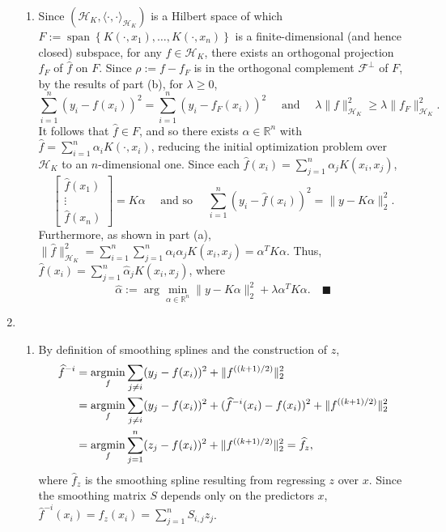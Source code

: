 \documentclass[11pt]{article}
\renewcommand{\qed}{\quad \ensuremath{\blacksquare}}
\newcommand{\vspan}{\operatorname{span}}
\newcommand{\F}{\mathcal{F}}
\newcommand{\R}{\mathbb{R}} %
\renewcommand{\H}{\mathscr{H}} %
\renewcommand{\hat}{\widehat}
\newcommand{\argmin}{\operatornamewithlimits{argmin}}
\begin{document}
\begin{enumerate}
\begin{enumerate}
\item Since $(\H_K, \langle \cdot, \cdot \rangle_{\H_K})$ is a Hilbert space
of which $F := \vspan\left\{ K(\cdot, x_1),\dots,K(\cdot,x_n) \right\}$ is a
finite-dimensional (and hence closed) subspace, for any $f \in \H_K$, there
exists an orthogonal projection $f_F$ of $\hat f$ on $F$. Since
$\rho := f - f_F$ is in the orthogonal complement $\F^\perp$ of $F$,
by the results of part (b), for $\lambda \geq 0$,
\[\sum_{i = 1}^n (y_i - f(x_i))^2 = \sum_{i = 1}^n (y_i - f_F(x_i))^2
    \quad \mbox{ and } \quad
    \lambda \|f\|_{\H_K}^2 \geq \lambda \|f_F\|_{\H_K}^2.\]
It follows that $\hat f \in F$, and so there exists $\alpha \in \R^n$ with
$\hat f = \sum_{i = 1}^n \alpha_i K(\cdot, x_i)$, reducing the initial
optimization problem over $\H_K$ to an $n$-dimensional one. Since each
$\hat f(x_i) = \sum_{j = 1}^n \alpha_j K(x_i, x_j)$,
\[\begin{bmatrix}
    \hat f(x_1) \\
    \vdots  \\
    \hat f(x_n)
\end{bmatrix}
    = K\alpha
\quad \mbox{ and so } \quad
\sum_{i = 1}^n (y_i - \hat f(x_i))^2 = \|y - K\alpha\|_2^2.\]
Furthermore, as shown in part (a),
$\|\hat f\|_{\H_K}^2
    = \sum_{i = 1}^n \sum_{j = 1}^n \alpha_i\alpha_j K(x_i,x_j)
    = \alpha^T K \alpha$.
Thus, $\hat f(x_i) = \sum_{j = 1}^n \hat\alpha_j K(x_i, x_j)$, where
\[\hat\alpha
    := \arg\min_{\alpha \in \R^n} \|y - K\alpha\|_2^2
    + \lambda \alpha^T K \alpha. \qed\]
\end{enumerate}

\newpage
\item
\begin{enumerate}
\item By definition of smoothing splines and the construction of $z$,
\begin{align*}
\hat f^{-i}
 &  = \argmin_f \sum_{j \neq i} (y_j - f(x_i))^2 + \|f^{((k + 1)/2)}\|_2^2  \\
 &  = \argmin_f \sum_{j \neq i} (y_j - f(x_i))^2 + (\hat f^{-i}(x_i)
                                    - f(x_i))^2 + \|f^{((k + 1)/2)}\|_2^2   \\
 &  = \argmin_f \sum_{j = 1}^n (z_j - f(x_i))^2 + \|f^{((k + 1)/2)}\|_2^2
    = \hat f_z,
\end{align*}
where $\hat f_z$ is the smoothing spline resulting from regressing $z$ over
$x$. Since the smoothing matrix $S$ depends only on the predictors $x$,
$\hat f^{-i}(x_i) = f_z(x_i) = \sum_{j = 1}^n S_{i,j} z_j$.


\end{enumerate}
\end{enumerate}
\end{document}

